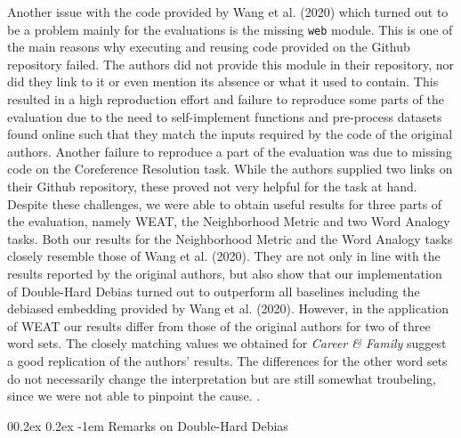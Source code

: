 \documentclass[
  english,
  man,floatsintext]{apa6}
\makeatletter
\let\oldparagraph\paragraph
\renewcommand{\paragraph}[1]{\oldparagraph{#1}\mbox{}}
\renewcommand{\paragraph}{\@startsection{paragraph}{4}{\parindent}%
  {0\baselineskip \@plus 0.2ex \@minus 0.2ex}%
  {-1em}%
  {\normalfont\normalsize\bfseries\itshape\typesectitle}}
\makeatother
\begin{document}
Another issue with the code provided by Wang et al. (2020) which turned out to be a problem mainly for the evaluations is the missing \texttt{web} module. This is one of the main reasons why executing and reusing code provided on the Github repository failed. The authors did not provide this module in their repository, nor did they link to it or even mention its absence or what it used to contain. This resulted in a high reproduction effort and failure to reproduce some parts of the evaluation due to the need to self-implement functions and pre-process datasets found online such that they match the inputs required by the code of the original authors.
Another failure to reproduce a part of the evaluation was due to missing code on the Coreference Resolution task. While the authors supplied two links on their Github repository, these proved not very helpful for the task at hand.
Despite these challenges, we were able to obtain useful results for three parts of the evaluation, namely WEAT, the Neighborhood Metric and two Word Analogy tasks. Both our results for the Neighborhood Metric and the Word Analogy tasks closely resemble those of Wang et al. (2020). They are not only in line with the results reported by the original authors, but also show that our implementation of Double-Hard Debias turned out to outperform all baselines including the debiased embedding provided by Wang et al. (2020). However, in the application of WEAT our results differ from those of the original authors for two of three word sets. The closely matching values we obtained for \emph{Career \& Family} suggest a good replication of the authors' results. The differences for the other word sets do not necessarily change the interpretation but are still somewhat troubeling, since we were not able to pinpoint the cause. .

\hypertarget{remarks-on-double-hard-debias}{%
\paragraph{Remarks on Double-Hard Debias}\label{remarks-on-double-hard-debias}}
\end{document}
